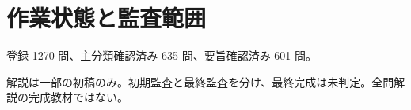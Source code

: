 \chapter{作業状態と監査範囲}
登録 1270 問、主分類確認済み 635 問、要旨確認済み 601 問。
\par 解説は一部の初稿のみ。初期監査と最終監査を分け、最終完成は未判定。全問解説の完成教材ではない。
